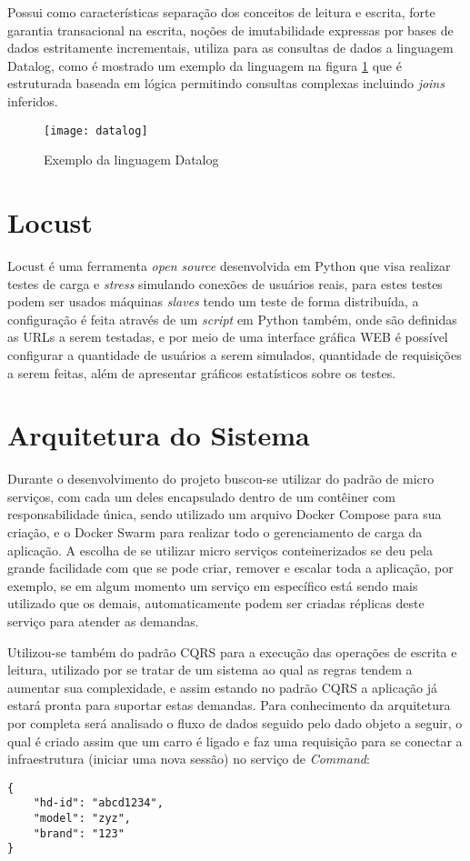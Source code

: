 Possui como características separação dos conceitos de leitura e escrita, forte garantia transacional na escrita, noções de imutabilidade expressas por bases de dados estritamente incrementais, utiliza para as consultas de dados a linguagem Datalog, como é mostrado um exemplo da linguagem na figura \ref{fig:datalog} que é estruturada baseada em lógica permitindo consultas complexas incluindo \textit{joins} inferidos.~\cite{datomic} 

\begin{figure}[!h]
\caption{\label{fig:datalog} Exemplo da linguagem Datalog}
\begin{center}
\texttt{[image: datalog]}
\end{center}
\end{figure}

\section{Locust}
Locust é uma ferramenta \textit{open source} desenvolvida em Python que visa realizar testes de carga e \textit{stress} simulando conexões de usuários reais, para estes testes podem ser usados máquinas \textit{slaves} tendo um teste de forma distribuída, a configuração é feita através de um \textit{script} em Python também, onde são definidas as URLs a serem testadas, e por meio de uma interface gráfica WEB é possível configurar a quantidade de usuários a serem simulados, quantidade de requisições a serem feitas, além de apresentar gráficos estatísticos sobre os testes.~\cite{locust}

\section{Arquitetura do Sistema}
Durante o desenvolvimento do projeto buscou-se utilizar do padrão de micro serviços, com cada um deles encapsulado dentro de um contêiner com responsabilidade única, sendo utilizado um arquivo Docker Compose para sua criação, e o Docker Swarm para realizar todo o gerenciamento de carga da aplicação. A escolha de se utilizar micro serviços conteinerizados se deu pela grande facilidade com que se pode criar, remover e escalar toda a aplicação, por exemplo, se em algum momento um serviço em específico está sendo mais utilizado que os demais, automaticamente podem ser criadas réplicas deste serviço para atender as demandas.~\cite{dockerswarm}

Utilizou-se também do padrão CQRS para a execução das operações de escrita e leitura, utilizado por se tratar de um sistema ao qual as regras tendem a aumentar sua complexidade, e assim estando no padrão CQRS a aplicação já estará pronta para suportar estas demandas. Para conhecimento da arquitetura por completa será analisado o fluxo de dados seguido pelo dado objeto a seguir, o qual é criado assim que um carro é ligado e faz uma requisição para se conectar a infraestrutura (iniciar uma nova sessão) no serviço de \textit{Command}:
\begin{lstlisting}
{
	"hd-id": "abcd1234",
	"model": "zyz",
	"brand": "123"
}
\end{lstlisting}


